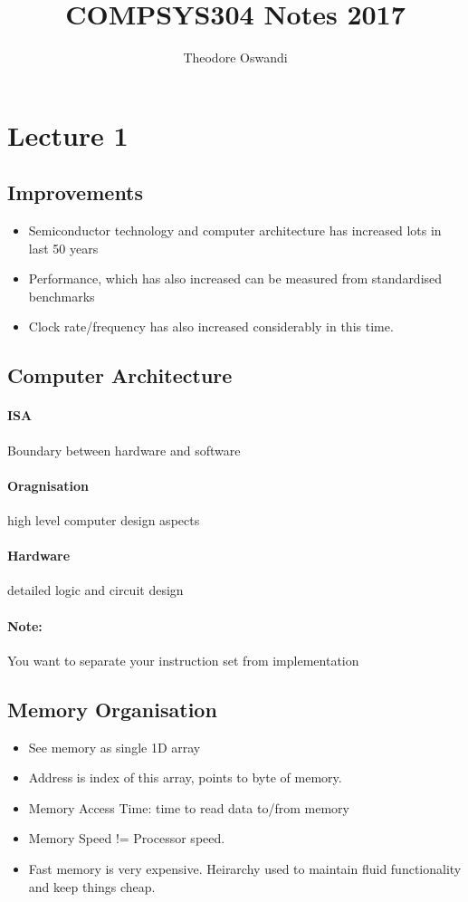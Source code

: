 \documentclass{article}
\title{COMPSYS304 Notes 2017}
\author{Theodore Oswandi}
\newcommand\tab[1][0.5cm]{\hspace*{#1}}
\begin{document}
 \maketitle{} 

\section{Lecture 1}
	\subsection{Improvements}
		\begin{itemize}
			\item Semiconductor technology and computer architecture has increased lots in last 50 years
			\item Performance, which has also increased can be measured from standardised benchmarks
			\item Clock rate/frequency has also increased considerably in this time.
		\end{itemize}

	\subsection{Computer Architecture}
		\paragraph{\tab ISA} Boundary between hardware and software
		\paragraph{\tab Oragnisation} high level computer design aspects
		\paragraph{\tab Hardware} detailed logic and circuit design

		\paragraph{\tab Note:} You want to separate your instruction set from implementation

	\subsection{Memory Organisation}
		\begin{itemize}
			\item See memory as single 1D array
			\item Address is index of this array, points to byte of memory.
			\item Memory Access Time: time to read data to/from memory \\ 
			\item Memory Speed != Processor speed.
			\item Fast memory is very expensive. Heirarchy used to maintain fluid functionality and keep things cheap.
		\end{itemize}
\end{document}
